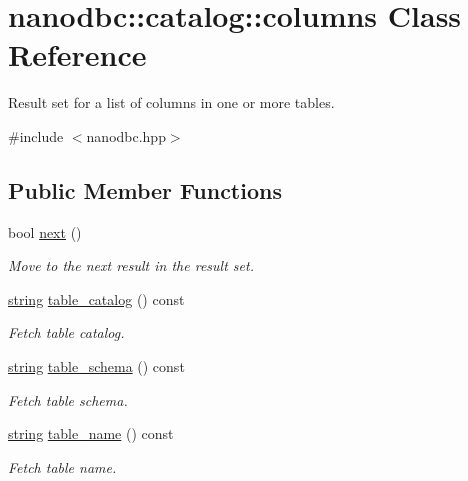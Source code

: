 \hypertarget{classnanodbc_1_1catalog_1_1columns}{}\section{nanodbc\+::catalog\+::columns Class Reference}
\label{classnanodbc_1_1catalog_1_1columns}


Result set for a list of columns in one or more tables.  




{\ttfamily \#include $<$nanodbc.\+hpp$>$}

\subsection*{Public Member Functions}
\begin{DoxyCompactItemize}
\item 
bool \mbox{\hyperlink{classnanodbc_1_1catalog_1_1columns_a81a4fc993319b106131a8f2c23874042}{next}} ()
\begin{DoxyCompactList}\small\item\em Move to the next result in the result set. \end{DoxyCompactList}\item 
\mbox{\hyperlink{namespacenanodbc_abfc0ece56278e590911ec8352774c212}{string}} \mbox{\hyperlink{classnanodbc_1_1catalog_1_1columns_a21b22abe9b7ac3cec9d6ddbd25b56a3f}{table\+\_\+catalog}} () const
\begin{DoxyCompactList}\small\item\em Fetch table catalog. \end{DoxyCompactList}\item 
\mbox{\hyperlink{namespacenanodbc_abfc0ece56278e590911ec8352774c212}{string}} \mbox{\hyperlink{classnanodbc_1_1catalog_1_1columns_a5996e5ea342e758f14481776e75e74bd}{table\+\_\+schema}} () const
\begin{DoxyCompactList}\small\item\em Fetch table schema. \end{DoxyCompactList}\item 
\mbox{\hyperlink{namespacenanodbc_abfc0ece56278e590911ec8352774c212}{string}} \mbox{\hyperlink{classnanodbc_1_1catalog_1_1columns_ab817aa0f9b4114a6d1ca7dc0449367ca}{table\+\_\+name}} () const
\begin{DoxyCompactList}\small\item\em Fetch table name. \end{DoxyCompactList}\item 

\end{DoxyCompactItemize}
